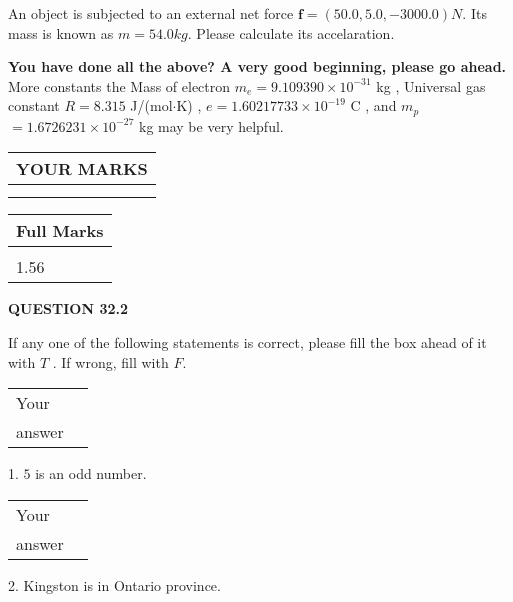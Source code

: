 \documentclass[12pt]{article}
\begin{document}
  
 
An object is subjected to an external net force $\mathbf{f}=(
50.0,  %
5.0,
-3000.0  )N$. Its mass is known as
$m= %
54.0 kg$. Please calculate its accelaration.
 
 

 

 
\vspace{0.3in}
   
   
\vspace{0.3in}
{\textbf{\LARGE{You have done all the above? A very good beginning, please go ahead.}}}
More constants the
Mass of electron
$m_e$$ =
9.109390 \times 10^{-31} $
kg
,
Universal gas constant
$R$$ =
8.315 $
J/(mol$\cdot $K)
,
$e$$ =
1.60217733 \times 10^{-19} $
C
, and
$m_p$$ =
1.6726231 \times 10^{-27} $
kg
%
may be very helpful.
\vspace{0.3in}
   
   
  
\vspace{0.2in}
  
\noindent\begin{tabular}{|l|}
\hline
 YOUR MARKS  \\
\hline
 \\ 
 \\ 
\hline
\end{tabular}
\hspace{0.05in} \begin{tabular}{|l|}
\hline
 Full Marks  \\
\hline
 \\ 
1.56 \\
\hline
\end{tabular}
{\textbf{\Large{QUESTION
32.2 
}}}
  
  
If any one of the following statements is correct, please fill the box ahead of it with $T$ .
If wrong, fill with $F$.
 
\noindent\begin{tabular}{|l|l|}\hline Your&\hspace{.2in} \\ answer&\hspace{.2in} \\ \hline \end{tabular}
1. $ %
5$ is an  %
odd number.
 
\noindent\begin{tabular}{|l|l|}\hline Your&\hspace{.2in} \\ answer&\hspace{.2in} \\ \hline \end{tabular}
2.  %
Kingston is in  %
Ontario province.
 
\end{document}
